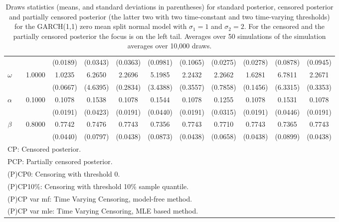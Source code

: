 {\begin{sidewaystable}
\begin{tabular}{cc cc| cccc| cccc}
 &&   & (0.0189) & (0.0343) & (0.0363) & (0.0981) & (0.1065) &(0.0275) & (0.0278) & (0.0878) & (0.0945)  \\ 
 \rowcolor{LightCyan} 
$\omega$&& 1.0000 & 1.0235 & 6.2650 & 2.2696 & 5.1985 & 2.2432 & 2.2662 & 1.6281 & 6.7811 & 2.2671  \\   
 &&   & (0.0667) & (4.6395) & (0.2834) & (3.4388) & (0.3557) &(0.7858) & (0.1456) & (6.3315) & (0.3353)  \\ 
 \rowcolor{LightCyan} 
$\alpha$&& 0.1000 & 0.1078 & 0.1538 & 0.1078 & 0.1544 & 0.1078 & 0.1255 & 0.1078 & 0.1531 & 0.1078  \\   
 &&   & (0.0191) & (0.0423) & (0.0191) & (0.0440) & (0.0191) &(0.0315) & (0.0191) & (0.0446) & (0.0191)  \\ 
 \rowcolor{LightCyan} 
$\beta$&& 0.8000 & 0.7742 & 0.7476 & 0.7743 & 0.7356 & 0.7743 & 0.7710 & 0.7743 & 0.7365 & 0.7743  \\   
 &&   & (0.0440) & (0.0797) & (0.0438) & (0.0873) & (0.0438) &(0.0658) & (0.0438) & (0.0899) & (0.0438)  \\ 
\hline 
\multicolumn{12}{l}{\footnotesize{CP: Censored posterior.}}  \\ 
\multicolumn{12}{l}{\footnotesize{PCP: Partially censored posterior.}} \\ 
\multicolumn{12}{l}{\footnotesize{(P)CP0: Censoring with threshold 0.}} \\ 
\multicolumn{12}{l}{\footnotesize{(P)CP10\%: Censoring with threshold 10\% sample quantile.}}  \\ 
\multicolumn{12}{l}{\footnotesize{(P)CP var mf: Time Varying Censoring, model-free method.}} \\ 
\multicolumn{12}{l}{\footnotesize{(P)CP var mle: Time Varying Censoring, MLE based method.}}  \\ 
\end{tabular}
\caption{Draws statistics (means,
and standard deviations in parentheses) for standard posterior, censored posterior and partially censored posterior (the latter two with two time-constant and two time-varying thresholds) for the GARCH(1,1) zero mean split normal model with $\sigma_{1} = 1$ and $\sigma_{2} = 2$. For the censored and the partially censored posterior the focus is on the left tail. Averages over 50 simulations of the simulation averages over 10,000 draws.} 
\label{tab:garch11_pcp_draws}  
\end{sidewaystable}
}